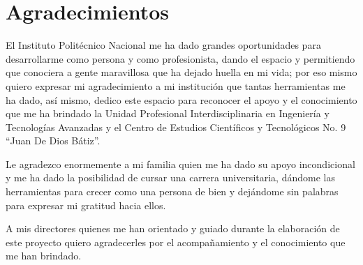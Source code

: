 \chapter*{Agradecimientos}
	
	\vspace*{5mm}
	
	El Instituto Politécnico Nacional me ha dado grandes oportunidades para desarrollarme como persona y como profesionista, dando el espacio y permitiendo que conociera a gente maravillosa que ha dejado huella en mi vida; por eso mismo quiero expresar mi agradecimiento a mi institución que tantas herramientas me ha dado, así mismo, dedico este espacio para reconocer el apoyo y el conocimiento que me ha brindado la Unidad Profesional Interdisciplinaria en Ingeniería y Tecnologías Avanzadas y el Centro de Estudios Científicos y Tecnológicos No. 9 ``Juan De Dios Bátiz''.
	
	Le agradezco enormemente a mi familia quien me ha dado su apoyo incondicional y me ha dado la posibilidad de cursar una carrera universitaria, dándome las herramientas para crecer como una persona de bien y dejándome sin palabras para expresar mi gratitud hacia ellos.
	
	A mis directores quienes me han orientado y guiado durante la elaboración de este proyecto quiero agradecerles por el acompañamiento y el conocimiento que me han brindado.